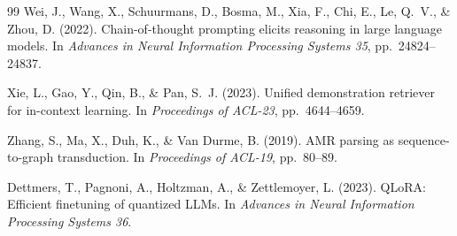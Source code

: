 \documentclass[11pt,a4paper]{article}
\begin{document}
\begin{thebibliography}{99}
Wei, J., Wang, X., Schuurmans, D., Bosma, M., Xia, F., Chi, E., Le, Q.\ V., \&
Zhou, D. (2022).
Chain-of-thought prompting elicits reasoning in large language models.
In \textit{Advances in Neural Information Processing Systems 35}, pp.\ 24824--24837.

Xie, L., Gao, Y., Qin, B., \& Pan, S.\ J. (2023).
Unified demonstration retriever for in-context learning.
In \textit{Proceedings of ACL-23}, pp.\ 4644--4659.

Zhang, S., Ma, X., Duh, K., \& Van Durme, B. (2019).
AMR parsing as sequence-to-graph transduction.
In \textit{Proceedings of ACL-19}, pp.\ 80--89.

Dettmers, T., Pagnoni, A., Holtzman, A., \& Zettlemoyer, L. (2023).
QLoRA: Efficient finetuning of quantized LLMs.
In \textit{Advances in Neural Information Processing Systems 36}.

\end{thebibliography}
\end{document}
